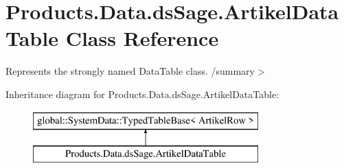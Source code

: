 \hypertarget{class_products_1_1_data_1_1ds_sage_1_1_artikel_data_table}{}\section{Products.\+Data.\+ds\+Sage.\+Artikel\+Data\+Table Class Reference}
\label{class_products_1_1_data_1_1ds_sage_1_1_artikel_data_table}


Represents the strongly named Data\+Table class. /summary$>$  


Inheritance diagram for Products.\+Data.\+ds\+Sage.\+Artikel\+Data\+Table\+:\begin{figure}[H]
\begin{center}
\leavevmode
\includegraphics[height=2.000000cm]{class_products_1_1_data_1_1ds_sage_1_1_artikel_data_table}
\end{center}
\end{figure}
